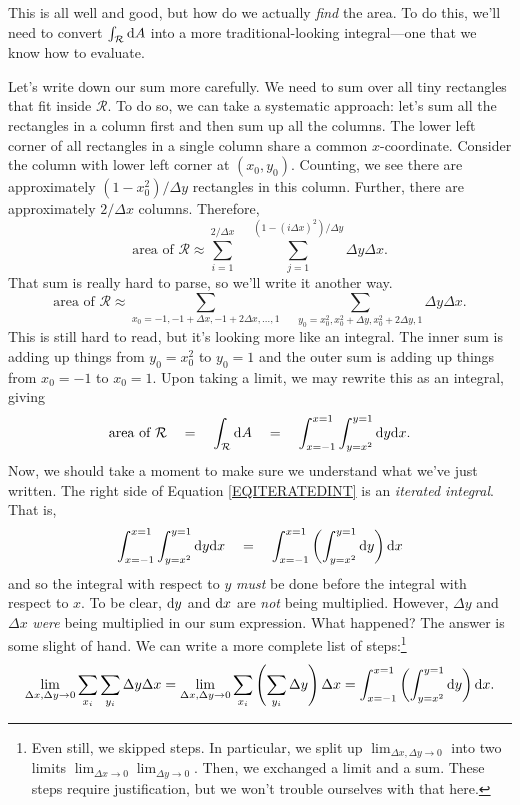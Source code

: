 This is all well and good, but how do we actually \emph{find} the area.  To do this, we'll
need to convert $\int_{\mathcal R}\mathrm{d} A$ into a more traditional-looking integral---one that we
know how to evaluate.

Let's write down our sum more carefully.  We need to sum over all tiny rectangles that fit inside
$\mathcal R$.  To do so, we can take a systematic approach: let's sum all the rectangles
in a column first and then sum up all the columns.  The lower left corner of all 
rectangles in a single column share a common $x$-coordinate.  Consider
the column with lower left corner at $(x_0,y_0)$.  Counting, we see there
are approximately $(1-x_0^2)/\Delta y$ rectangles in this column.  Further, there are approximately
$2/\Delta x$ columns.  Therefore,
\[
	\text{area of }\mathcal R\approx 
	\sum_{i=1}^{2/\Delta x}\quad\sum_{j=1}^{(1-(i\Delta x)^2)/\Delta y} \Delta y\Delta x.
\]
That sum is really hard to parse, so we'll write it another way.
\[
	\text{area of }\mathcal R\approx
	\sum_{x_0=-1,-1+\Delta x,-1+2\Delta x,\ldots,1}
	\quad
	\sum_{y_0=x_0^2,x_0^2+\Delta y,x_0^2+2\Delta y,1}
	\Delta y\Delta x.
\]
This is still hard to read, but it's looking more like an integral.  The inner sum
is adding up things from $y_0=x_0^2$ to $y_0=1$ and the outer sum is adding up
things from $x_0=-1$ to $x_0=1$.  Upon taking a limit, we may rewrite this as an
integral, giving
\begin{equation}
	\label{EQITERATEDINT}
	\text{area of }\mathcal R\quad
	=\quad
	\int_{\mathcal R}\mathrm{d} A \quad =\quad \int_{x=-1}^{x=1}\int_{y=x^2}^{y=1} \mathrm{d} y\mathrm{d} x.
\end{equation}
Now, we should take a moment to make sure we understand what we've just written.  The
right side of Equation \eqref{EQITERATEDINT} is an \emph{iterated integral}.
That is,
\[
	\int_{x=-1}^{x=1}\int_{y=x^2}^{y=1} \mathrm{d} y\mathrm{d} x
	\quad 
	=
	\quad \int_{x=-1}^{x=1}\left(\int_{y=x^2}^{y=1} \mathrm{d} y\right)\mathrm{d} x
\]
and so the integral with respect to $y$ \emph{must} be done before the integral with respect to $x$.
To be clear, $\mathrm{d} y$ and $\mathrm{d} x$ are \emph{not} being multiplied.  However, $\Delta y$ and $\Delta x$ 
\emph{were} being multiplied in our sum expression.  What happened?  The answer is some slight of
hand.  We can write a more complete list of steps:\footnote{ Even still, we skipped steps.
In particular, we split up $\lim_{\Delta x,\Delta y\to 0}$ into two limits 
$\lim_{\Delta x\to 0}\lim_{\Delta y\to 0}$.  Then, we exchanged a limit and a sum.  These
steps require justification, but we won't trouble ourselves with that here.}
\[
	\lim_{\Delta x,\Delta y\to 0} \sum_{x_i}\sum_{y_i} \Delta y\Delta x
	=
	\lim_{\Delta x,\Delta y\to 0} \sum_{x_i}\left(\sum_{y_i} \Delta y\right)\Delta x
	=\int_{x=-1}^{x=1}\left(\int_{y=x^2}^{y=1} \mathrm{d} y\right)\mathrm{d} x.
\]

